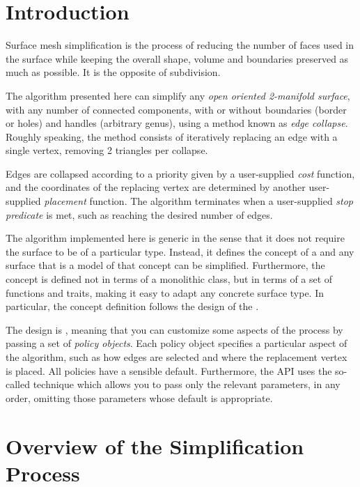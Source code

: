 \section{Introduction}
Surface mesh  simplification is the process of reducing the number of faces used in the surface while 
keeping the overall shape, volume and boundaries preserved as much as possible. 
It is the opposite of subdivision.

The algorithm presented here can simplify any {\em open oriented 2-manifold surface},
with any number of connected components, with or without boundaries (border or holes) 
and handles (arbitrary genus), using a method known as {\em edge collapse}.
Roughly speaking, the method consists of iteratively replacing an edge with a single vertex, 
removing 2 triangles per collapse.


Edges are collapsed according to a priority given by a user-supplied {\em cost} function,
and the coordinates of the replacing vertex are determined by another user-supplied
{\em placement} function. The algorithm terminates when a user-supplied {\em stop predicate} 
is met, such as reaching the desired number of edges.

The algorithm implemented here is generic in the sense that it does not require the surface 
to be of a particular type. Instead, it defines the concept of a 
and any surface that is a model of that concept can be simplified. Furthermore, the concept
is defined not in terms of a monolithic class, but in terms of a set of functions and traits,
making it easy to adapt any concrete surface type. In particular, the concept definition 
follows the design of the 
.

The design is ,
meaning that you can customize some aspects of the process by passing a set of
{\em policy objects}. Each policy object specifies a particular aspect of the algorithm,
such as how edges are selected and where the replacement vertex is placed. All policies have 
a sensible default.
Furthermore, the API uses the so-called  technique which allows you
to pass only the relevant parameters, in any order, omitting those parameters whose
default is appropriate.

\section{Overview of the Simplification Process}

